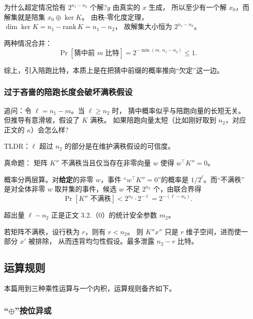 为什么超定情况恰有 $2^{n_1-n_2}$ 个解?$y$ 由真实的 $x$ 生成，
所以至少有一个解 $x_0$，而解集就是陪集 $x_0 \oplus \ker K$。
由秩-零化度定理，$\dim \ker K = n_1 - \mathrm{rank}\, K = n_1 - n_2$，
故解集大小恒为 $2^{n_1-n_2}$。

两种情况合并：
\begin{equation}\label{eq:02-kos15:20}
\Pr\left[\text{猜中前 } m \text{ 比特}\right] = 2^{-\min(m,\, n_1-n_2)} \le 1.
\end{equation}

综上，引入陪跑比特，本质上是在把猜中前缀的概率推向“欠定”这一边。

\subsubsection{过于吝啬的陪跑长度会破坏满秩假设}

追问：令 $\ell =n_1-m$。当 $\ell \ge n_2$ 时，
猜中概率似乎与陪跑向量的长短无关。但推导有意滑坡，假设了 $K$ 满秩。
如果陪跑向量太短（比如刚好取到 $n_2$，对应正文的 $\kappa$）会怎么样?

TLDR：$\ell$ 超过 $n_2$ 的部分是在维护满秩假设的可信度。

真命题：
矩阵 $K''$ 不满秩当且仅当存在非零向量 $w$ 使得 $w^\intercal K'' = 0$。

概率分两层算。对\textbf{给定}的非零 $w$，事件
“$w^\intercal K'' = 0$”的概率是 $1/2^{\ell}$。而“不满秩”
是对全体非零 $w$ 取并集的事件，候选 $w$ 不足 $2^{n_2}$ 个，由联合界得
\begin{equation}\label{eq:02-kos15:21}
\Pr\left[K'' \text{ 不满秩}\right] < 2^{n_2} \cdot 2^{-\ell} = 2^{-(\ell - n_2)}.
\end{equation}

超出量 $\ell - n_2$ 正是正文 3.2.（0）的统计安全参数 $m_2$。

若矩阵不满秩，设行秩为 $r$，则有 $r<n_2$。
则 $K''x''$ 只是 $r$ 维子空间，进而使一部分 $x'$ 被排除，
从而违背均匀性假设。最多泄露 $n_2-r$ 比特。

\subsection{运算规则}

本篇用到三种乘性运算与一个内积，运算规则备齐如下。

\subsubsection{\texorpdfstring{“$\oplus$”按位异或}{“\textbackslash oplus”按位异或}}

